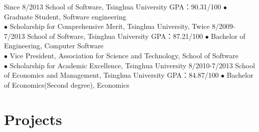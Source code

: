 \documentclass[]{friggeri-cv}
\begin{document}
\begin{entrylist}
  \entry
    {Since 8/2013}
    {School of Software, Tsinghua University}
    {GPA：90.31/100}
    {$\bullet$ Graduate Student, Software engineering \\
    $\bullet$ Scholarship for Comprehensive Merit, Tsinghua University, Twice
    }
  \entry
    {8/2009-7/2013}
    {School of Software, Tsinghua University}
    {GPA：87.21/100}
    {$\bullet$ Bachelor of Engineering, Computer Software \\
    $\bullet$ Vice President, Association for Science and Technology, School of Software\\
    $\bullet$ Scholarship for Academic Excellence, Tsinghua University 
    }
  \entry
    {8/2010-7/2013}
    {School of Economics and Management, Tsinghua University}
    {GPA：84.87/100}
    {$\bullet$ Bachelor of Economics(Second degree), Economics}
\end{entrylist}

\section{Projects}
\end{document}
